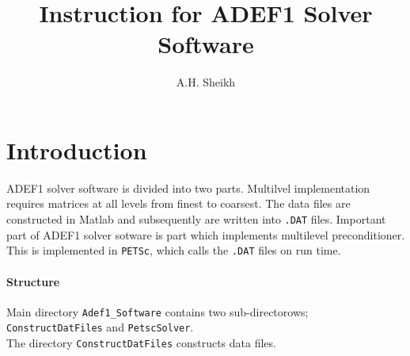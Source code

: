 \documentclass[a4paper,11pt]{article}
\author{A.H. Sheikh}
\title{Instruction for ADEF1 Solver Software}
\date{}
\begin{document}
%
\maketitle
%
\section{Introduction}
ADEF1 solver software is divided into two parts. Multilvel implementation
requires matrices at all levels from finest to coarsest. The data files are
constructed in Matlab and subsequently are written into \texttt{.DAT} files.
Important part of ADEF1 solver sotware is part which implements multilevel
preconditioner. This is implemented in \texttt{PETSc}, which calls the 
\texttt{.DAT} files on run time. 
\paragraph{Structure}
Main directory  \texttt{Adef1\_Software} contains two sub-directorows;
\texttt{ConstructDatFiles} and \texttt{PetscSolver}.\\
The directory \texttt{ConstructDatFiles} constructs data files. 
\end{document}
